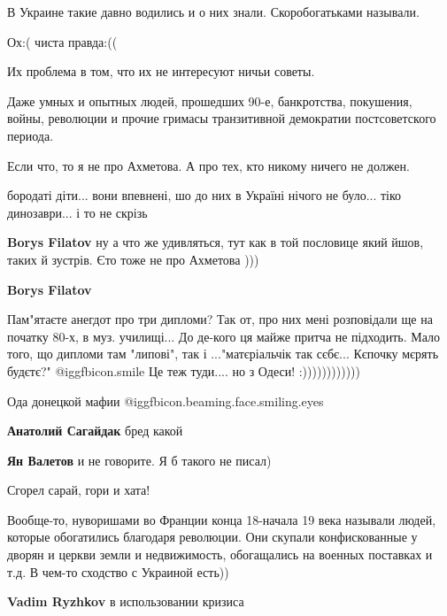 \begin{itemize}
\begin{itemize}
\end{itemize} %

В Украине такие давно водились и о них знали. Скоробогатьками называли.

Ох:( чиста правда:((


Их проблема в том, что их не интересуют ничьи советы.

Даже умных и опытных людей, прошедших 90-е, банкротства, покушения, войны,
революции и прочие гримасы транзитивной демократии постсоветского периода.

Если что, то я не про Ахметова. А про тех, кто никому ничего не должен.

\begin{itemize} %

бородаті діти... вони впевнені, шо до них в Україні нічого не було... тіко
динозаври... і то не скрізь

\textbf{Borys Filatov} ну а что же удивляться, тут как в той пословице який йшов, таких й зустрів. Єто тоже не про Ахметова )))

\textbf{Borys Filatov} 

Пам"ятаєте анегдот про три дипломи? Так от, про них мені розповідали ще на
початку 80-х, в муз. училищі... До де-кого ця майже притча не підходить. Мало
того, що дипломи там "липові", так і ..."матєріальчік так сєбє... Кєпочку мєрять
будєтє?"  @igg{fbicon.smile}  Це теж туди.... но з Одеси! :))))))))))))

\end{itemize} %

Ода донецкой мафии  @igg{fbicon.beaming.face.smiling.eyes} 

\textbf{Анатолий Сагайдак} бред какой

\textbf{Ян Валетов} и не говорите. Я б такого не писал)

Сгорел сарай, гори и хата!


Вообще-то, нуворишами во Франции конца 18-начала 19 века называли людей,
которые обогатились благодаря революции. Они скупали конфискованные у дворян и
церкви земли и недвижимость, обогащались на военных поставках и т.д. В чем-то
сходство с Украиной есть))

\begin{itemize} %
\textbf{Vadim Ryzhkov} в использовании кризиса


\end{itemize}
\end{itemize}
